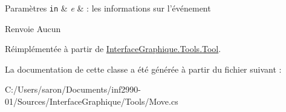 \begin{DoxyParams}[1]{Paramètres}
\mbox{\tt in}  & {\em e} & \-: les informations sur l'événement\\
\hline
\end{DoxyParams}
\begin{DoxyReturn}{Renvoie}
Aucun 
\end{DoxyReturn}


Réimplémentée à partir de \hyperlink{class_interface_graphique_1_1_tools_1_1_tool_aedd1c93f96ee602475b7cbc3c9c99baa}{Interface\-Graphique.\-Tools.\-Tool}.



La documentation de cette classe a été générée à partir du fichier suivant \-:\begin{DoxyCompactItemize}
\item 
C\-:/\-Users/saron/\-Documents/inf2990-\/01/\-Sources/\-Interface\-Graphique/\-Tools/Move.\-cs\end{DoxyCompactItemize}
